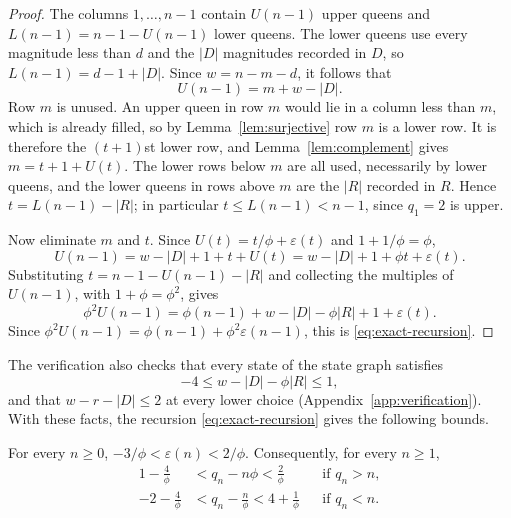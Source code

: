\begin{proof}
The columns $1,\dots,n-1$ contain $U(n-1)$ upper queens and
$L(n-1)=n-1-U(n-1)$ lower queens. The lower queens use every
magnitude less than $d$ and the $|D|$ magnitudes recorded in $D$, so
$L(n-1)=d-1+|D|$. Since $w=n-m-d$, it follows that
\[
 U(n-1)=m+w-|D|.
\]
Row $m$ is unused. An upper queen in row $m$ would lie in a column
less than $m$, which is already filled, so by Lemma~\ref{lem:surjective}
row $m$ is a lower row. It is therefore the $(t+1)$st lower row, and
Lemma~\ref{lem:complement} gives $m=t+1+U(t)$. The lower rows below
$m$ are all used, necessarily by lower queens, and the lower queens
in rows above $m$ are the $|R|$ recorded in $R$. Hence
$t=L(n-1)-|R|$; in particular $t\le L(n-1)<n-1$, since $q_1=2$ is
upper.

Now eliminate $m$ and $t$. Since $U(t)=t/\phi+\varepsilon(t)$ and
$1+1/\phi=\phi$,
\[
 U(n-1)=w-|D|+1+t+U(t)=w-|D|+1+\phi t+\varepsilon(t).
\]
Substituting $t=n-1-U(n-1)-|R|$ and collecting the multiples of
$U(n-1)$, with $1+\phi=\phi^2$, gives
\[
 \phi^2U(n-1)=\phi(n-1)+w-|D|-\phi|R|+1+\varepsilon(t).
\]
Since $\phi^2U(n-1)=\phi(n-1)+\phi^2\varepsilon(n-1)$, this is
\eqref{eq:exact-recursion}.
\end{proof}

The verification also checks that every state of the state graph
satisfies
\begin{equation}\label{eq:sharper-check}
 -4\le w-|D|-\phi|R|\le1,
\end{equation}
and that $w-r-|D|\le2$ at every lower choice
(Appendix~\ref{app:verification}). With these facts, the recursion
\eqref{eq:exact-recursion} gives the following bounds.

\begin{proposition}\label{prop:sharper}
For every $n\ge0$, $-3/\phi<\varepsilon(n)<2/\phi$. Consequently, for
every $n\ge1$,
\[
 \begin{aligned}
 1-\frac{4}{\phi}&<q_n-n\phi<\frac{2}{\phi}&&\text{if }q_n>n,\\[3pt]
 -2-\frac{4}{\phi}&<q_n-\frac{n}{\phi}<4+\frac{1}{\phi}&&\text{if }q_n<n.
 \end{aligned}
\]
\end{proposition}

